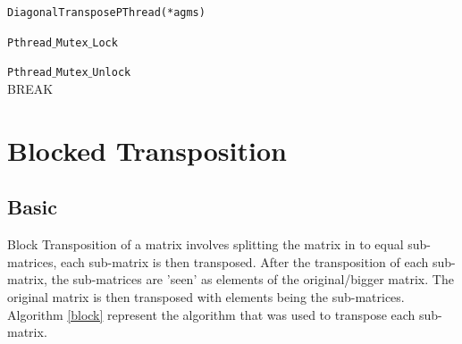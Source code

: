 \documentclass[conference]{IEEEtran}
\begin{document}
\begin{algorithm}[h!]




\caption{\texttt{DiagonalTransposePThread(*agms)}}
{

\texttt{Pthread$\_$Mutex$\_$Lock}



\texttt{Pthread$\_$Mutex$\_$Unlock}\\
 {BREAK}
}
\label{diag}
\end{algorithm}

\section{Blocked Transposition}
\subsection{Basic}
Block Transposition of a matrix involves splitting the matrix in to equal sub-matrices, each sub-matrix is then transposed. After the transposition of each sub-matrix, the sub-matrices are 'seen' as elements of the original/bigger matrix. The original matrix is then transposed with elements being the sub-matrices. Algorithm \ref{block} represent the algorithm that was used to transpose each sub-matrix. 
\end{document}
